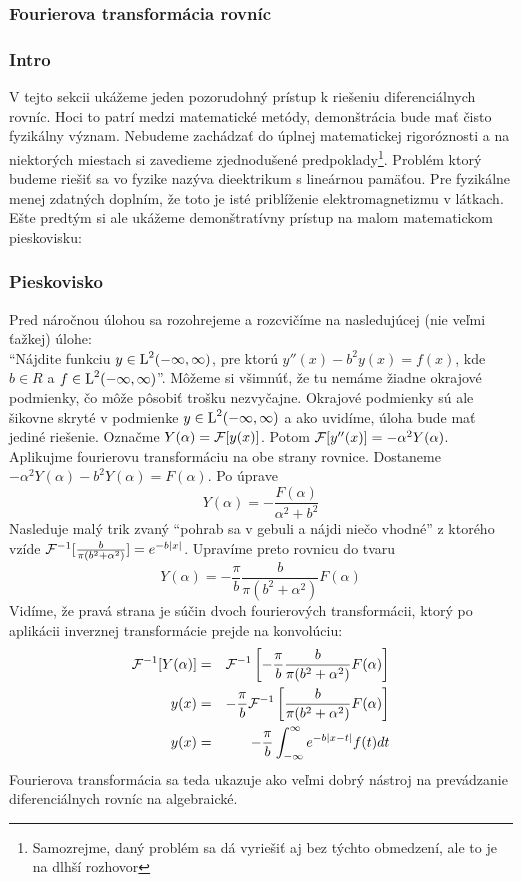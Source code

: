 \subsubsection{Fourierova transformácia rovníc}

\subsubsection{Intro}


V tejto sekcii ukážeme jeden pozorudohný prístup k riešeniu
diferenciálnych rovníc. Hoci to patrí medzi matematické
metódy, demonštrácia bude mať čisto fyzikálny význam. Nebudeme
zachádzať do úplnej matematickej rigoróznosti a na niektorých miestach
si zavedieme zjednodušené predpoklady\footnote{Samozrejme, daný
problém sa dá vyriešiť aj bez týchto obmedzení, ale to je na dlhší
rozhovor}. Problém ktorý budeme riešiť sa vo fyzike nazýva dieektrikum
s lineárnou pamäťou. Pre fyzikálne menej zdatných doplním, že toto je
isté priblíženie elektromagnetizmu v látkach. Ešte predtým si ale
ukážeme demonštratívny prístup na malom matematickom pieskovisku:

\subsubsection{Pieskovisko}

Pred náročnou úlohou sa rozohrejeme a rozcvičíme na nasledujúcej (nie
veľmi ťažkej) úlohe: \\
``Nájdite funkciu $y \in \mbox{L}^2(-\infty,\infty)$, pre ktorú
$y''(x) - b^2 y(x) = f(x)$, kde $b\in R$ a $f \in \mbox{L}^2(-\infty,\infty)$''.
Môžeme si všimnúť, že tu nemáme žiadne okrajové podmienky, čo môže
pôsobiť trošku nezvyčajne. Okrajové podmienky sú ale šikovne skryté v
podmienke $y \in \mbox{L}^2(-\infty,\infty)$ a ako uvidíme, úloha bude mať jediné
riešenie.
Označme $Y(\alpha)=\mathcal{F}[y(x)]$. Potom $\mathcal{F}[y''(x)] =
-\alpha^2 Y(\alpha)$.
Aplikujme fourierovu transformáciu na obe strany rovnice.
Dostaneme $-\alpha^2 Y(\alpha) - b^2 Y(\alpha) = F(\alpha)$.
Po úprave 
\begin{equation}
    Y(\alpha)= -\frac{F(\alpha)}{\alpha^2 + b^2}
\end{equation}
Nasleduje malý trik zvaný ``pohrab sa v gebuli a nájdi niečo vhodné''
z ktorého vzíde
$\mathcal{F}^{-1}[\frac{b}{\pi(b^2+\alpha^2)}]=e^{-b|x|}$.
Upravíme preto rovnicu do tvaru
\begin{equation}
    Y(\alpha) = -\frac{\pi}{b} \frac{b}{\pi(b^2 + \alpha^2)}
    F(\alpha)
\end{equation}
Vidíme, že pravá strana je súčin dvoch fourierových transformácii,
ktorý po aplikácii inverznej transformácie prejde na konvolúciu:
\begin{eqnarray*}
    \mathcal{F}^{-1}[Y(\alpha)] &=& \mathcal{F}^{-1}\left[
            -\frac{\pi}{b} \frac{b}{\pi(b^2 + \alpha^2)}
            F(\alpha)\right] \\
    y(x) &=&  -\frac{\pi}{b} \mathcal{F}^{-1}\left[\frac{b}{\pi(b^2 +
    \alpha^2)} F(\alpha)\right] \\
    y(x) &=& -\frac{\pi}{b} \int_{-\infty}^{\infty} e^{-b |x-t|} f(t) dt
\end{eqnarray*}
Fourierova transformácia sa teda ukazuje ako veľmi dobrý nástroj na
prevádzanie diferenciálnych rovníc na algebraické.

